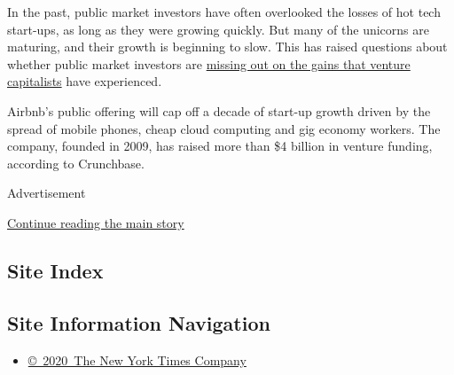 In the past, public market investors have often overlooked the losses of
hot tech start-ups, as long as they were growing quickly. But many of
the unicorns are maturing, and their growth is beginning to slow. This
has raised questions about whether public market investors are
\href{https://www.nytimes3xbfgragh.onion/2019/03/28/business/startups-ipo.html}{missing
out on the gains that venture capitalists} have experienced.

Airbnb's public offering will cap off a decade of start-up growth driven
by the spread of mobile phones, cheap cloud computing and gig economy
workers. The company, founded in 2009, has raised more than \$4 billion
in venture funding, according to Crunchbase.

Advertisement

\protect\hyperlink{after-bottom}{Continue reading the main story}

\hypertarget{site-index}{%
\subsection{Site Index}\label{site-index}}

\hypertarget{site-information-navigation}{%
\subsection{Site Information
Navigation}\label{site-information-navigation}}

\begin{itemize}
\tightlist
\item
  \href{https://help.nytimes3xbfgragh.onion/hc/en-us/articles/115014792127-Copyright-notice}{©~2020~The
  New York Times Company}
\end{itemize}

